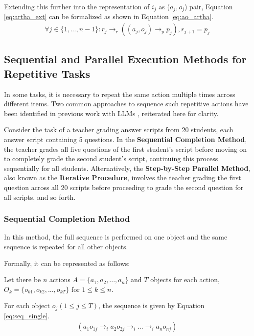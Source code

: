 \documentclass[a4paper,11pt]{lmcs}
\begin{document}
Extending this further into the representation  of $i_j$ as ($a_j,o_j$) pair, Equation \ref{eq:artha_ext} can be formalized as shown in Equation \ref{eq:ao_artha}.
\begin{eqnarray}
 \label{eq:ao_artha}
\forall j \in \{1,...,n-1\}: r_j \rightarrow_r ((a_j,o_j) \rightarrow_p p_j), r_{j+1} = p_j
\end{eqnarray}

\subsection{Sequential and Parallel Execution Methods for Repetitive Tasks}
\label{sec:pravritti}
In some tasks, it is necessary to repeat the same action multiple times across different items. Two common approaches to sequence such repetitive actions have been identified in previous work with LLMs \cite{llm_mira}, reiterated here for clarity.

Consider the task of a teacher grading answer scripts from 20 students, each answer script containing 5 questions. In the \textbf{Sequential Completion Method}, the teacher grades all five questions of the first student's script before moving on to completely grade the second student’s script, continuing this process sequentially for all students. Alternatively, the \textbf{Step-by-Step Parallel Method}, also known as the \textbf{Iterative Procedure}, involves the teacher grading the first question across all 20 scripts before proceeding to grade the second question for all scripts, and so forth.


\subsubsection{Sequential Completion Method}
In this method, the full sequence is performed on one object and the same sequence is repeated for all other objects.

Formally, it can be represented as follows:

Let there be $n$ actions $A = \{a_1,a_2,...,a_n\}$ and $T$ objects for each action, $O_k = \{o_{k1},o_{k2},...,o_{kT}\}$ for $1\leq k \leq n$.

For each object $o_j (1 \leq j \leq T)$, the sequence is given by Equation \ref{eq:seq_single}.
\begin{eqnarray}
 \label{eq:seq_single}
 (a_1o_{1j} \rightarrow_i a_2o_{2j} \rightarrow_i... \rightarrow_i a_no_{nj})
\end{eqnarray}
\end{document}
